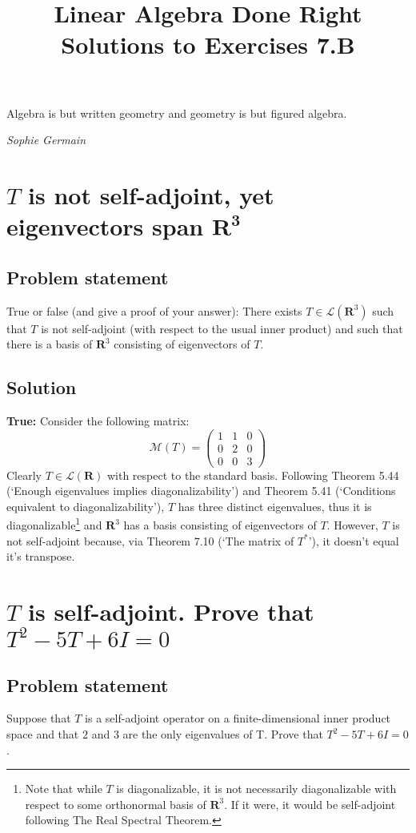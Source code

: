 \documentclass{article}
\title{Linear Algebra Done Right\\Solutions to Exercises 7.B}
\author{}
\date{}
\begin{document}
\maketitle

\epigraph{Algebra is but written geometry and geometry is but figured algebra.}{\textit{Sophie Germain}}

\section{$T$ is not self-adjoint, yet eigenvectors span $\mathbf{R^3}$}
\subsection*{Problem statement}
True or false (and give a proof of your answer): There exists $T\in\mathcal{L}(\mathbf{R}^3)$ such that $T$ is not self-adjoint (with respect to the usual inner product) and such that there is a basis of $\mathbf{R}^3$ consisting of eigenvectors of $T$.

\subsection*{Solution}
\textbf{True:} Consider the following matrix:
\[\mathcal{M}(T) = \begin{pmatrix}1 & 1 & 0 \\0 & 2 & 0 \\0 & 0 & 3\end{pmatrix}\]
Clearly $T\in\mathcal{L}(\mathbf{R})$ with respect to the standard basis. Following Theorem 5.44 (`Enough eigenvalues implies diagonalizability') and Theorem 5.41 (`Conditions equivalent to diagonalizability'), $T$ has three distinct eigenvalues, thus it is diagonalizable\footnote{Note that while $T$ is diagonalizable, it is not necessarily diagonalizable with respect to some orthonormal basis of $\mathbf{R}^3$. If it were, it would be self-adjoint following The Real Spectral Theorem.} and $\mathbf{R}^3$ has a basis consisting of eigenvectors of $T$. However, $T$ is not self-adjoint because, via Theorem 7.10 (`The matrix of $T^*$'), it doesn't equal it's transpose.

\clearpage

\section{$T$ is self-adjoint. Prove that $T^2-5T+6I=0$}
\subsection*{Problem statement}
Suppose that $T$ is a self-adjoint operator on a finite-dimensional inner product space and that $2$ and $3$ are the only eigenvalues of T. Prove that $T^2-5T+6I=0$.
\end{document}

